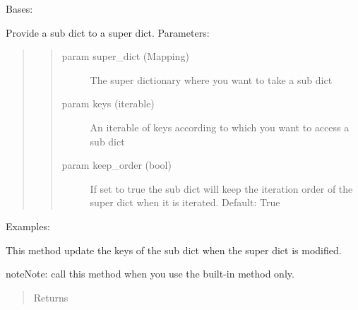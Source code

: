 \documentclass[letterpaper,10pt,english]{sphinxmanual}
\begin{document}
\begin{fulllineitems}
\label{\detokenize{metann.utils:metann.utils.SubDict}}
Bases: 

Provide a sub dict  to a super dict.
Parameters:
\begin{quote}
\begin{quote}\begin{description}
\item[{param super\_dict (Mapping)}] \leavevmode
The super dictionary where you want to take a sub dict

\item[{param keys (iterable)}] \leavevmode
An iterable of keys according to which you want to access a sub dict

\item[{param keep\_order (bool)}] \leavevmode
If set to true the sub dict will keep the iteration order of the super dict
when it is iterated. Default: True

\end{description}\end{quote}
\end{quote}

Examples:

\begin{sphinxVerbatim}[commandchars=\\\{\}]
\end{sphinxVerbatim}

\begin{fulllineitems}
\label{\detokenize{metann.utils:metann.utils.SubDict.update_keys}}
This method update the keys of the sub dict when the super dict is modified.

\begin{sphinxadmonition}{note}{Note:}
 call this method when you use the built-in method only.
\end{sphinxadmonition}
\begin{quote}\begin{description}
\item[{Returns}] \leavevmode


\end{description}\end{quote}

\end{fulllineitems}


\end{fulllineitems}
\end{document}
